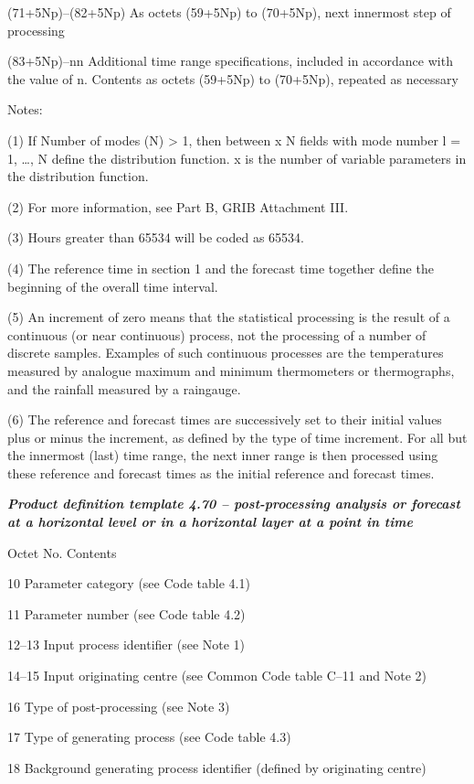 (71+5Np)--(82+5Np) As octets (59+5Np) to (70+5Np), next innermost step of processing

(83+5Np)--nn Additional time range specifications, included in accordance with the value of n. Contents as octets (59+5Np) to (70+5Np), repeated as necessary

Notes:

(1) If Number of modes (N) \textgreater{} 1, then between x N fields with mode number l = 1, \ldots, N define the distribution function. x is the number of variable parameters in the distribution function.

(2) For more information, see Part B, GRIB Attachment III.

(3) Hours greater than 65534 will be coded as 65534.

(4) The reference time in section 1 and the forecast time together define the beginning of the overall time interval.

(5) An increment of zero means that the statistical processing is the result of a continuous (or near continuous) process, not the processing of a number of discrete samples. Examples of such continuous processes are the temperatures measured by analogue maximum and minimum thermometers or thermographs, and the rainfall measured by a raingauge.

(6) The reference and forecast times are successively set to their initial values plus or minus the increment, as defined by the type of time increment. For all but the innermost (last) time range, the next inner range is then processed using these reference and forecast times as the initial reference and forecast times.

\emph{\textbf{Product definition template 4.70 -- post-processing analysis or forecast at a horizontal level or in a horizontal layer at a point in time}}

Octet No. Contents

10 Parameter category (see Code table 4.1)

11 Parameter number (see Code table 4.2)

12--13 Input process identifier (see Note 1)

14--15 Input originating centre (see Common Code table C--11 and Note 2)

16 Type of post-processing (see Note 3)

17 Type of generating process (see Code table 4.3)

18 Background generating process identifier (defined by originating centre)

